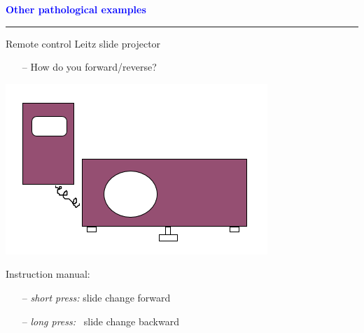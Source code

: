 \documentclass[pdf]{beamer}
\begin{document}
\begin{frame}
    \textcolor{Blue}{\textbf{\Large{Other pathological examples}}}
    \textcolor{red}{\rule{10cm}{1mm}}

{\large Remote control Leitz slide projector}
\newline
\begin{itemize}
	\item[\textcolor{black}{--}] {\normalsize How do you forward/reverse?}
\end{itemize}
\begin{center}
\includegraphics[scale=0.5]{16_slide_projector.png}
\end{center}

{\large Instruction manual:}
\begin{itemize}
	\item[\textcolor{black}{--}] {\normalsize \textit{short press:} \qquad slide change forward}
	\item[\textcolor{black}{--}] {\normalsize \textit{long press:} \qquad \ slide change backward}
\end{itemize}
\end{frame}
\end{document}
